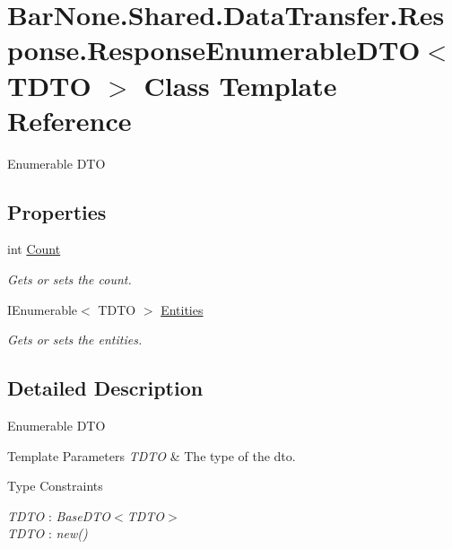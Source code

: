 \hypertarget{class_bar_none_1_1_shared_1_1_data_transfer_1_1_response_1_1_response_enumerable_d_t_o}{}\section{Bar\+None.\+Shared.\+Data\+Transfer.\+Response.\+Response\+Enumerable\+D\+TO$<$ T\+D\+TO $>$ Class Template Reference}
\label{class_bar_none_1_1_shared_1_1_data_transfer_1_1_response_1_1_response_enumerable_d_t_o}


Enumerable D\+TO  


\subsection*{Properties}
\begin{DoxyCompactItemize}
\item 
int \mbox{\hyperlink{class_bar_none_1_1_shared_1_1_data_transfer_1_1_response_1_1_response_enumerable_d_t_o_a987d128f66d27cd813cf61dec9b07594}{Count}}
\begin{DoxyCompactList}\small\item\em Gets or sets the count. \end{DoxyCompactList}\item 
I\+Enumerable$<$ T\+D\+TO $>$ \mbox{\hyperlink{class_bar_none_1_1_shared_1_1_data_transfer_1_1_response_1_1_response_enumerable_d_t_o_abdc43d9c2098366ba7f305fc409d9552}{Entities}}
\begin{DoxyCompactList}\small\item\em Gets or sets the entities. \end{DoxyCompactList}\end{DoxyCompactItemize}


\subsection{Detailed Description}
Enumerable D\+TO 


\begin{DoxyTemplParams}{Template Parameters}
{\em T\+D\+TO} & The type of the dto.\\
\hline
\end{DoxyTemplParams}
\begin{Desc}
\item[Type Constraints]\begin{description}
\item[{\em T\+D\+TO} : {\em Base\+D\+TO$<$T\+D\+TO$>$}]\item[{\em T\+D\+TO} : {\em new()}]\end{description}
\end{Desc}


